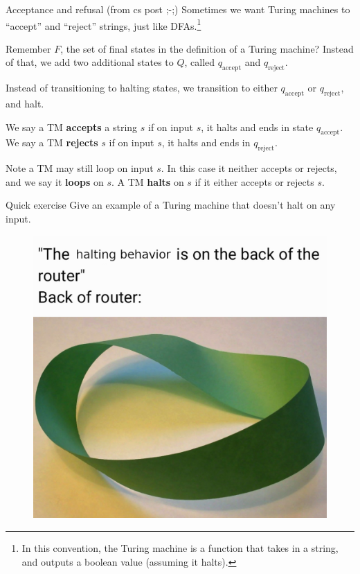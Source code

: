 \documentclass{beamer}
\begin{document}
\begin{frame}{Acceptance and refusal (from cs post ;-;)}
Sometimes we want Turing machines to ``accept'' and ``reject'' strings, just like DFAs.\footnote{In this convention, the Turing machine is a function that takes in a string, and outputs a boolean value (assuming it halts).}

Remember $F$, the set of final states in the definition of a Turing machine? Instead of that, we add two additional states to $Q$, called $q_\text{accept}$ and $q_\text{reject}$. 

Instead of transitioning to halting states, we transition to either $q_\text{accept}$ or $q_\text{reject}$, and halt. 

We say a TM \textbf{accepts} a string $s$ if on input $s$, it halts and ends in state $q_\text{accept}$. We say a TM \textbf{rejects} $s$ if on input $s$, it halts and ends in $q_\text{reject}$. 

\vspace{2mm}

Note a TM may still loop on input $s$. In this case it neither accepts or rejects, and we say it \textbf{loops} on $s$. A TM \textbf{halts} on $s$ if it either accepts or rejects $s$.
\end{frame}

\begin{frame}{Quick exercise}
Give an example of a Turing machine that doesn't halt on any input.
\begin{figure}[h]
\includegraphics[scale=0.7]{img/halting.jpg}
\end{figure}
\end{frame}
\end{document}
